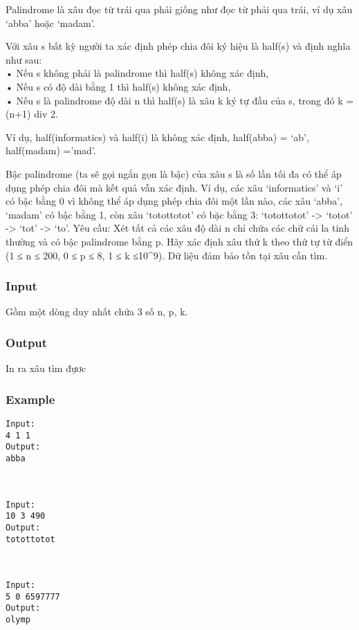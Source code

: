 



   Palindrome là xâu đọc từ trái qua phải giống như đọc từ phải qua trái, ví dụ xâu ‘abba’ hoặc ‘madam’.  

   Với xâu s bất kỳ người ta xác định phép chia đôi ký hiệu là half(s) và định nghĩa như sau:   
\\   • Nếu s không phải là palindrome thì half(s) không xác định,   
\\   • Nếu s có độ dài bằng 1 thì half(s) không xác định,   
\\   • Nếu s là palindrome độ dài n thì half(s) là xâu k ký tự đầu của s, trong đó k = (n+1) div 2.  

   Ví dụ, half(informatics) và half(i) là không xác định, half(abba) = ‘ab’, half(madam) =’mad’.  

   Bậc palindrome (ta sẽ gọi ngắn gọn là bậc) của xâu s là số lần tối đa có thể áp dụng phép chia đôi mà kết quả vẫn xác định. Ví dụ, các xâu ‘informatics’ và ‘i’ có bậc bằng 0 vì không thể áp dụng phép chia đôi một lần nào, các xâu ‘abba’, ‘madam’ có bậc bằng 1, còn xâu ‘totottotot’ có bặc bằng 3: ‘totottotot’ -> ‘totot’ -> ‘tot’ -> ‘to’.       Yêu cầu:      Xét tất cả các xâu độ dài n chỉ chứa các chữ cái la tinh thường và có bậc palindrome bằng p. Hãy xác định xâu thứ k theo thứ tự từ điển (1 ≤ n ≤ 200, 0 ≤ p ≤ 8, 1 ≤ k ≤10^9). Dữ liệu đảm bảo tồn tại xâu cần tìm.  

\subsubsection{   Input  }

   Gồm một dòng duy nhất chứa 3 số n, p, k.  

\subsubsection{   Output  }

   In ra xâu tìm đựơc  

\subsubsection{   Example  }
\begin{verbatim}
Input:
4 1 1
Output:
abba



Input:
10 3 490
Output:
totottotot



Input:
5 0 6597777
Output:
olymp
\end{verbatim}
